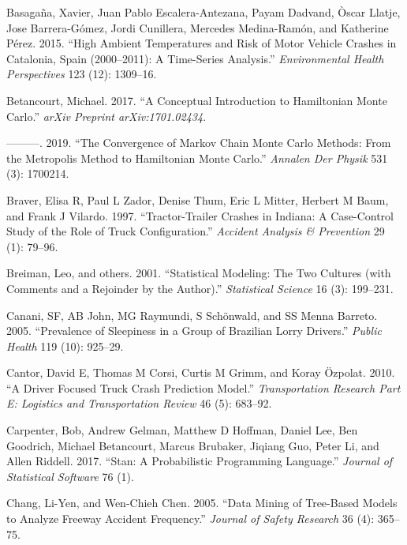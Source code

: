 \documentclass[12pt]{book}
\numberwithin{equation}{chapter}
\begin{document}
\leavevmode\hypertarget{ref-basagana2015high}{}%
Basagaña, Xavier, Juan Pablo Escalera-Antezana, Payam Dadvand, Òscar Llatje, Jose Barrera-Gómez, Jordi Cunillera, Mercedes Medina-Ramón, and Katherine Pérez. 2015. ``High Ambient Temperatures and Risk of Motor Vehicle Crashes in Catalonia, Spain (2000--2011): A Time-Series Analysis.'' \emph{Environmental Health Perspectives} 123 (12): 1309--16.

\leavevmode\hypertarget{ref-betancourt2017conceptual}{}%
Betancourt, Michael. 2017. ``A Conceptual Introduction to Hamiltonian Monte Carlo.'' \emph{arXiv Preprint arXiv:1701.02434}.

\leavevmode\hypertarget{ref-betancourt2019convergence}{}%
---------. 2019. ``The Convergence of Markov Chain Monte Carlo Methods: From the Metropolis Method to Hamiltonian Monte Carlo.'' \emph{Annalen Der Physik} 531 (3): 1700214.

\leavevmode\hypertarget{ref-braver1997tractor}{}%
Braver, Elisa R, Paul L Zador, Denise Thum, Eric L Mitter, Herbert M Baum, and Frank J Vilardo. 1997. ``Tractor-Trailer Crashes in Indiana: A Case-Control Study of the Role of Truck Configuration.'' \emph{Accident Analysis \& Prevention} 29 (1): 79--96.

\leavevmode\hypertarget{ref-breiman2001statistical}{}%
Breiman, Leo, and others. 2001. ``Statistical Modeling: The Two Cultures (with Comments and a Rejoinder by the Author).'' \emph{Statistical Science} 16 (3): 199--231.

\leavevmode\hypertarget{ref-canani2005prevalence}{}%
Canani, SF, AB John, MG Raymundi, S Schönwald, and SS Menna Barreto. 2005. ``Prevalence of Sleepiness in a Group of Brazilian Lorry Drivers.'' \emph{Public Health} 119 (10): 925--29.

\leavevmode\hypertarget{ref-cantor2010driver}{}%
Cantor, David E, Thomas M Corsi, Curtis M Grimm, and Koray Özpolat. 2010. ``A Driver Focused Truck Crash Prediction Model.'' \emph{Transportation Research Part E: Logistics and Transportation Review} 46 (5): 683--92.

\leavevmode\hypertarget{ref-carpenter2017stan}{}%
Carpenter, Bob, Andrew Gelman, Matthew D Hoffman, Daniel Lee, Ben Goodrich, Michael Betancourt, Marcus Brubaker, Jiqiang Guo, Peter Li, and Allen Riddell. 2017. ``Stan: A Probabilistic Programming Language.'' \emph{Journal of Statistical Software} 76 (1).

\leavevmode\hypertarget{ref-chang2005data}{}%
Chang, Li-Yen, and Wen-Chieh Chen. 2005. ``Data Mining of Tree-Based Models to Analyze Freeway Accident Frequency.'' \emph{Journal of Safety Research} 36 (4): 365--75.
\end{document}
